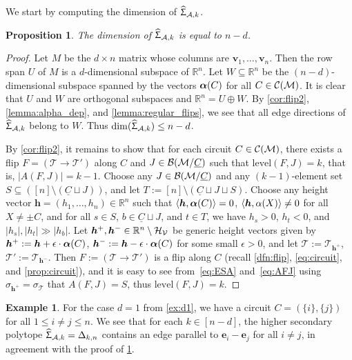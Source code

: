 \documentclass[11pt]{amsart}
\theoremstyle{plain}
\newtheorem{proposition}[theorem]{Proposition}
\theoremstyle{definition}
\newtheorem{example}[theorem]{Example}
\def\R{\mathbb{R}}
\def\v{{\bm{v}}}
\def\A{\mathcal{A}}
\def\h{{\bm{h}}}
\def\e{{\bm{e}}}
\def\level{\mathrm{level}}
\def\HSP{\widehat\Upsigma}
\def\Sigma{\HSP}
\def\Tcal{\mathcal{T}}
\def\suppC{{\underline{C}}}
\def\Tiling{\Tcal}
\let\subset\subseteq
\begin{document}
We start by computing the dimension of $\Sigma_{\A,k}$.
\begin{proposition}\label{prop:HSP_dim}
The dimension of $\Sigma_{\A,k}$ is equal to $n-d$.
\end{proposition}
\begin{proof}
Let $M$ be the $d\times n$ matrix whose columns are $\v_1,\dots,\v_n$. Then the row span $U$ of $M$ is a $d$-dimensional subspace of $\R^n$. Let $W\subset \R^n$ be the $(n-d)$-dimensional subspace spanned by the vectors $\bm{\alpha}(C)$ for all $C\in\mathcal{C}(\mathcal{M})$. It is clear that $U$ and $W$ are orthogonal subspaces and $\R^n=U\oplus W$. By \cref{cor:flip2},
\cref{lemma:alpha_dep},
	and \cref{lemma:regular_flips}, we see that all edge directions 
	of $\Sigma_{\A,k}$ belong to $W$. Thus $\dim(\Sigma_{\A,k})\leq n-d$.

	By \cref{cor:flip2}, it remains to show that for each circuit $C\in\mathcal{C}(\mathcal{M})$, there exists a flip $F=(\Tiling\to\Tiling')$ along $C$ and $J\in\BMC$ such that $\level(F,J)=k$, that is, $|A(F,J)|=k-1$. Choose any $J\in\BMC$ and any $(k-1)$-element set $S\subset ([n]\setminus (\suppC\sqcup J))$, and let $T:=[n]\setminus (\suppC\sqcup J\sqcup S)$. Choose any height vector $\h=(h_1,\dots,h_n)\in\R^n$ such that $\<\h,\alphaC\>=0$, $\<\h,\alphaX(X)\>\neq0$ for all $X\neq \pm C$, and for all $s\in S$, $b\in \suppC\sqcup J$, and $t\in T$, we have $h_s>0$, $h_t<0$,  and $|h_s|,|h_t|\gg |h_b|$. Let $\h^+,\h^-\in\GHV$ be generic height vectors given by $\h^+:=\h+\epsilon\cdot \alphaC$, $\h^-:=\h-\epsilon\cdot \alphaC$ for some small $\epsilon>0$, and let $\Tiling:=\Tiling_{\h^+}$, $\Tiling':=\Tiling_{\h^-}$. Then $F:=(\Tiling\to\Tiling')$ is a flip along $C$
	(recall  
	\cref{dfn:flip}, \eqref{eq:circuit}, and \cref{prop:circuit}), 
	 and it is easy to see from~\eqref{eq:ESA} and~\eqref{eq:AFJ} using $\sigma_{\h^+}=\sigma_\Tiling$ that $A(F,J)=S$, thus $\level(F,J)=k$.
\end{proof}

\begin{example}
For the case $d=1$ from \cref{ex:d1}, we have a circuit $C=(\{i\},\{j\})$ for all $1\leq i\neq j\leq n$. We see that for each $k\in[n-d]$, the higher secondary polytope $\Sigma_{\A,k}=\Delta_{k,n}$ contains an edge parallel to $\e_i-\e_j$ for all $i\neq j$, in agreement with the proof of \cref{prop:HSP_dim}.
\end{example}
\end{document}
